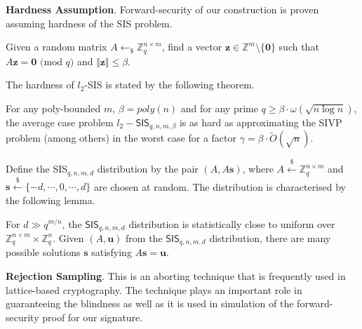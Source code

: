 \documentclass[runningheads]{llncs}
\def\bf{\mathbf}
\begin{document}
\noindent \textbf{Hardness Assumption}. 
Forward-security  of our construction is proven assuming hardness of the SIS problem.
\begin{definition} \label{def2}
	Given a random matrix $A \leftarrow_{\$} \mathbb{Z}_q^{n \times m}$, find a vector $\mathbf{z}\in \mathbb{Z}^{m} \setminus \{\mathbf{0}\}$ such that $A\mathbf{z} =\mathbf{0} \text{ (mod } q)$ and $\Vert \mathbf{z}\Vert \leq \beta.$  
\end{definition}

\noindent
The hardness of $l_2$-\textsf{SIS} is stated by the following theorem. 


\begin{theorem}\label{thm:SIS}%
For any poly-bounded $m$, $\beta=poly(n)$ and for any prime $q \geq \beta \cdot \omega(\sqrt{n\log n})$, 
the average case problem $l_2-\mathsf{SIS}_{q,n,m,\beta}$ is as hard as approximating the SIVP problem 
(among others) in the worst case for a factor $\gamma=\beta\cdot \tilde{O}(\sqrt{n})$.
\end{theorem}
%
\noindent
Define the \textsf{SIS}$_{q,n,m,d}$ distribution  by the pair $(A, A\bf{s})$,
where $A \xleftarrow{\$} \mathbb{Z}_q^{n \times m}$ and 
$\bf{s} \xleftarrow{\$} \{-d, \cdots, 0, \cdots, d\}$ are chosen at random.
The distribution is characterised by the following lemma.
%
\begin{lemma} \label{lem8}
	For $d \gg q^{m/n}$, the $\mathsf{SIS}_{q,n,m,d}$ distribution is statistically close to uniform
	over $\mathbb{Z}_q^{n \times m} \times \mathbb{Z}_q^{n}$.
	Given $(A, \bf{u})$ from the $\mathsf{SIS}_{q,n,m,d}$  distribution, there are many possible solutions $\bf{s}$ satisfying
	$A\bf{s} = \bf{u}$.
\end{lemma}
%
\noindent \textbf{Rejection Sampling}.  
This is an aborting technique that is frequently used in lattice-based cryptography. 
The technique plays an important role in guaranteeing the blindness 
as well as it is used in simulation of the forward-security proof for our signature. 
%
\end{document}

